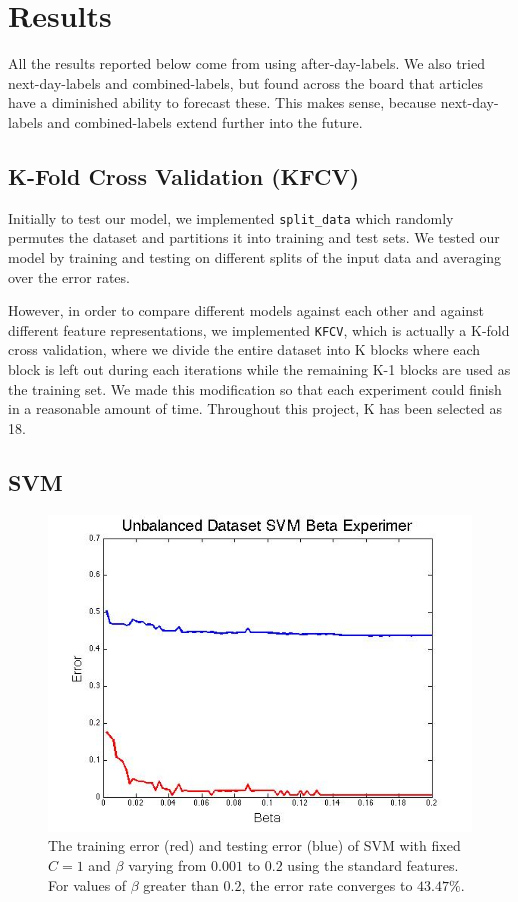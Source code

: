 \documentclass{article}
\begin{document}
\section{Results}

All the results reported below come from using after-day-labels. We also tried next-day-labels and combined-labels, but found across the board that articles have a diminished ability to forecast these. This makes sense, because next-day-labels and combined-labels extend further into the future.

\subsection{K-Fold Cross Validation (KFCV)}
Initially to test our model, we implemented \texttt{split\_data} which randomly permutes the dataset and partitions it into training and test sets. We tested our model by training and testing on different splits of the input data and averaging over the error rates. 

However, in order to compare different models against each other and against different feature representations, we implemented \texttt{KFCV}, which is actually a K-fold cross validation, where we divide the entire dataset into K blocks where each block is left out during each iterations while the remaining K-1 blocks are used as the training set. We made this modification so that each experiment could finish in a reasonable amount of time. Throughout this project, K has been selected as 18. 

\subsection{SVM}

\begin{figure}[t]
\vskip 0.2in
\begin{center}
\centerline{\includegraphics[width=\columnwidth]{beta_experiment.jpg}}
\caption{The training error (red) and testing error (blue) of SVM with fixed $C=1$ and $\beta$ varying from $0.001$ to $0.2$ using the standard features. For values of $\beta$ greater than $0.2$, the error rate converges to $43.47\%$.}
\label{beta-experiment}
\end{center}
\vskip -0.3in
\end{figure} 
\end{document}
